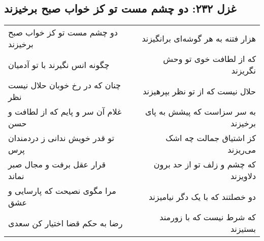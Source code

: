 \begin{center}
\section*{غزل ۲۳۲: دو چشم مست تو کز خواب صبح برخیزند}
\label{sec:232}
\begin{longtable}{l p{0.5cm} r}
دو چشم مست تو کز خواب صبح برخیزند
&&
هزار فتنه به هر گوشه‌ای برانگیزند
\\
چگونه انس نگیرند با تو آدمیان
&&
که از لطافت خوی تو وحش نگریزند
\\
چنان که در رخ خوبان حلال نیست نظر
&&
حلال نیست که از تو نظر بپرهیزند
\\
غلام آن سر و پایم که از لطافت و حسن
&&
به سر سزاست که پیشش به پای برخیزند
\\
تو قدر خویش ندانی ز دردمندان پرس
&&
کز اشتیاق جمالت چه اشک می‌ریزند
\\
قرار عقل برفت و مجال صبر نماند
&&
که چشم و زلف تو از حد برون دلاویزند
\\
مرا مگوی نصیحت که پارسایی و عشق
&&
دو خصلتند که با یک دگر نیامیزند
\\
رضا به حکم قضا اختیار کن سعدی
&&
که شرط نیست که با زورمند بستیزند
\\
\end{longtable}
\end{center}
